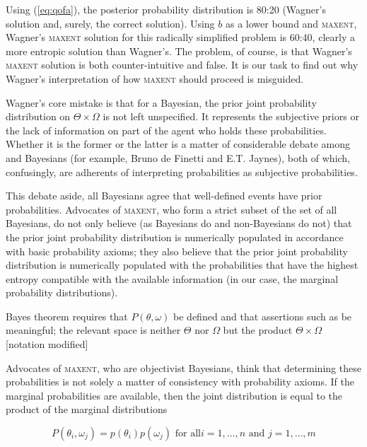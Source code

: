\documentclass[11pt]{article}
\begin{document}
Using (\ref{eq:qofa}), the posterior probability distribution is 80:20
(Wagner's solution and, surely, the correct solution). Using $b$ as a
lower bound and \textsc{maxent}, Wagner's \textsc{maxent} solution for
this radically simplified problem is 60:40, clearly a more entropic
solution than Wagner's. The problem, of course, is that Wagner's
\textsc{maxent} solution is both counter-intuitive and false. It is
our task to find out why Wagner's interpretation of how
\textsc{maxent} should proceed is misguided.

Wagner's core mistake is that for a Bayesian, the prior joint
probability distribution on $\Theta\times\Omega$ is not left
unspecified. It represents the subjective priors or the lack of
information on part of the agent who holds these probabilities.
Whether it is the former or the latter is a matter of considerable
debate among  and  Bayesians
(for example, Bruno de Finetti and E.T. Jaynes), both of which,
confusingly, are adherents of interpreting probabilities as subjective
probabilities. 

This debate aside, all Bayesians agree that well-defined events have
prior probabilities. Advocates of \textsc{maxent}, who form a strict
subset of the set of all Bayesians, do not only believe (as Bayesians
do and non-Bayesians do not) that the prior joint probability
distribution is numerically populated in accordance with basic
probability axioms; they also believe that the prior joint probability
distribution is numerically populated with the probabilities that have
the highest entropy compatible with the available information (in our
case, the marginal probability distributions).

\begin{quotex}
  Bayes theorem requires that $P(\theta,\omega)$ be defined and that
  assertions such as  be
  meaningful; the relevant space is neither $\Theta$ nor $\Omega$ but
  the product $\Theta\times\Omega$ [notation modified]
\end{quotex}

Advocates of \textsc{maxent}, who are objectivist Bayesians, think
that determining these probabilities is not solely a matter of
consistency with probability axioms. If the marginal probabilities are
available, then the joint distribution is equal to the product of the
marginal distributions

\begin{equation}
  \label{eq:prod}
P(\theta_{i},\omega_{j})=p(\theta_{i})p(\omega_{j})\mbox{ for all
}i=1,\ldots,n\mbox{ and }j=1,\ldots,m
\end{equation}
\end{document}
